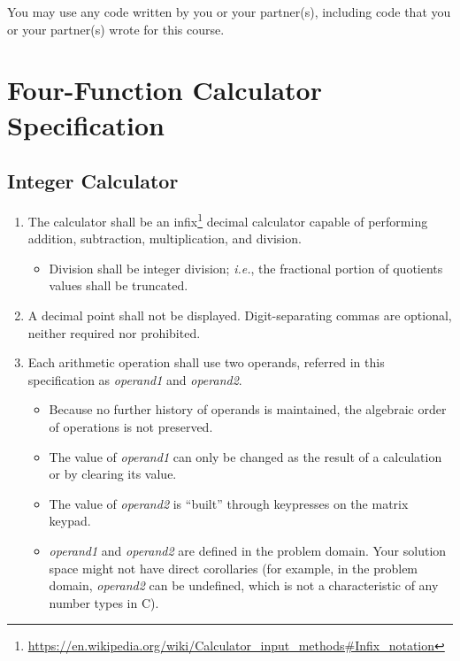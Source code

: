 You may use any code written by you or your partner(s), including code that you or your partner(s) wrote for this course.


\section{Four-Function Calculator Specification} \label{sec:FunctionalSpecification}

\subsection*{Integer Calculator}

\begin{enumerate}
\item \label{spec:IntegerCalculator} The calculator shall be an
    infix\footnote{\url{https://en.wikipedia.org/wiki/Calculator_input_methods\#Infix_notation}}
    decimal calculator capable of performing addition, subtraction,
    multiplication, and division.
    \begin{itemize}
    \item Division shall be integer division; \textit{i.e.}, the fractional portion of quotients values shall be truncated.
    \end{itemize}
\item \label{spec:NoDecimalPoint} A decimal point shall not be displayed. Digit-separating commas are optional, neither required nor prohibited.
\item Each arithmetic operation shall use two operands, referred in this
    specification as \textit{operand1} and \textit{operand2}.
    \begin{itemize}
    \item Because no further history of operands is maintained, the algebraic
        order of operations is not preserved.
    \item The value of \textit{operand1} can only be changed as the result of a
        calculation or by clearing its value.
    \item The value of \textit{operand2} is ``built'' through keypresses on the
        matrix keypad.
    \item \textit{operand1} and \textit{operand2} are defined in the problem
        domain. Your solution space might not have direct corollaries (for
        example, in the problem domain, \textit{operand2} can be undefined,
        which is not a characteristic of any number types in C).
    \end{itemize}


\end{enumerate}
